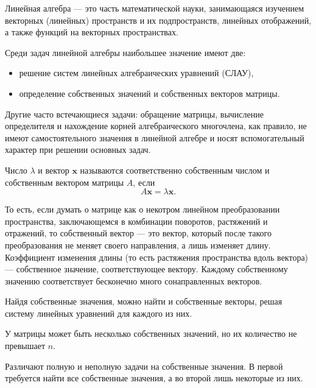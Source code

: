 

\Theory


Линейная алгебра — это часть математической науки, занимающаяся
изучением векторных (линейных) пространств и их подпространств,
линейных отображений, а также функций на векторных пространствах.

Среди задач линейной алгебры наибольшее значение имеют две:

\begin{itemize}
\item решение систем линейных алгебраических уравнений (СЛАУ),
\item определение собственных значений и собственных векторов матрицы.
\end{itemize}

Другие часто встечающиеся задачи: обращение матрицы, вычисление
определителя и нахождение корней алгебраического многочлена, как
правило, не имеют самостоятельного значения в линейной алгебре и носят
вспомогательный характер при решении основных задач.


Число $\lambda$ и вектор $\mathbf{x}$ называются соответственно
собственным числом и собственным вектором матрицы $A$, если
\[
A\mathbf{x}=\lambda\mathbf{x}.
\]


То есть, если думать о матрице как о некотром линейном преобразовании
пространства, заключающемся в комбинации поворотов, растяжений и отражений,
то собственный вектор — это вектор, который после такого преобразования
не меняет своего направления, а лишь изменяет длину. Коэффициент изменения
длины (то есть растяжения пространства вдоль вектора) — собственное
значение, соответствующее вектору. Каждому собственному значению соответствует
бесконечно много сонаправленных векторов.

Найдя собственные значения, можно найти и собственные векторы, решая
систему линейных уравнений для каждого из них.

У матрицы может быть несколько собственных значений, но их количество
не превышает $n$.

Различают полную и неполную задачи на собственные значения. В первой
требуется найти все собственные значения, а во второй лишь некоторые
из них.

